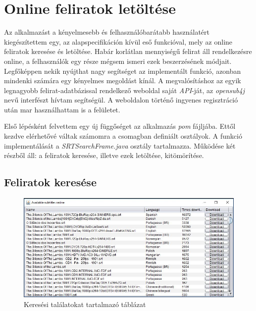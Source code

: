 \section{Online feliratok letöltése}

Az alkalmazást a kényelmesebb és felhasználóbarátabb használatért kiegészítettem egy, az alapspecifikáción kívül eső funkcióval, mely az online feliratok keresése és letöltése. Habár korlátlan mennyiségű felirat áll rendelkezésre online, a felhasználók egy része mégsem ismeri ezek beszerzésének módjait. Legfőképpen nekik nyújthat nagy segítséget az implementált funkció, azonban mindenki számára egy kényelmes megoldást kínál. A megvalósításhoz az egyik legnagyobb felirat-adatbázissal rendelkező weboldal saját \textit{API}-ját, az \textit{opensub4j} nevű interfészt hívtam segítségül. A weboldalon történő ingyenes regisztráció után mar használhattam is a felületet.

Első lépésként felvettem egy új függőséget az alkalmazás \textit{pom} fájljába. Ettől kezdve elérhetővé váltak számomra a csomagban definiált osztályok. A funkció implementálását a \textit{SRTSearchFrame.java} osztály tartalmazza. Működése két részből áll: a feliratok keresése, illetve ezek letöltése, kitömörítése.

\subsection{Feliratok keresése}

\begin{figure}[h!]
  \includegraphics[width=\linewidth]{images/online_search.jpg}
  \caption{Keresési találatokat tartalmazó táblázat}
  \label{fig:online_search}
\end{figure}

